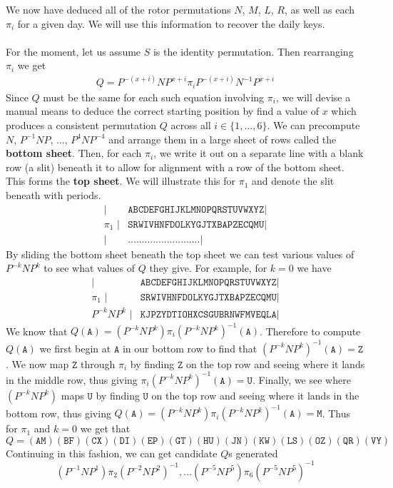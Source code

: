 We now have deduced all of the rotor permutations $N$, $M$, $L$, $R$,
as well as each
$\pi_i$ for a given day. We will use this information to recover
the daily keys.
\\\\For the moment, let us assume $S$ is the identity permutation. Then
rearranging $\pi_i$ we get
\begin{align}
  Q = P^{-(x+i)}NP^{x+i}\pi_iP^{-(x+i)}N^{-1}P^{x+i} \label{eq:q_eq}
\end{align}
Since $Q$ must be the same for each such equation involving
$\pi_i$, we will devise a manual means to deduce the correct
starting position by find a value of $x$ which produces a consistent
permutation $Q$ across all $i\in\{1,\dots,6\}$. We can
precompute $N$, $P^{-1}NP$, $\dots$, $P^{4}NP^{-4}$ and arrange them
in a large sheet of rows called the {\bf{bottom sheet}}. Then, for
each $\pi_i$, we write it out on a separate line with a blank row
(a slit) beneath it to allow for alignment with a row of the bottom
sheet. This forms the \textbf{top sheet}. We will
illustrate this for $\pi_1$ and denote the slit beneath with periods.
\begin{align*}
  \texttt{|}          & \texttt{ABCDEFGHIJKLMNOPQRSTUVWXYZ} \texttt{|} \\
  \pi_1\texttt{ |} & \texttt{SRWIVHNFDOLKYGJTXBAPZECQMU} \texttt{|} \\
  \texttt{|}          & \texttt{..........................} \texttt{|}
\end{align*}
By sliding the bottom sheet
beneath the top sheet we can test various values of $P^{-k}NP^{k}$ to
see what values of $Q$ they give. For example, for $k = 0$ we have
\begin{align*}
  \texttt{|}          & \texttt{ABCDEFGHIJKLMNOPQRSTUVWXYZ} \texttt{|} \\
  \pi_1\texttt{ |} & \texttt{SRWIVHNFDOLKYGJTXBAPZECQMU} \texttt{|} \\
  P^{-k}NP^{k} \texttt{ |}       &
  \texttt{KJPZYDTIOHXCSGUBRNWFMVEQLA} \texttt{|}
\end{align*}
We know that $Q(\texttt{A}) =
(P^{-k}NP^k)\pi_i(P^{-k}NP^k)^{-1}(\texttt{A})$. Therefore to compute
$Q(\texttt{A})$ we first begin at $\texttt{A}$ in our bottom row to
find that $(P^{-k}NP^k)^{-1}(\texttt{A})=\texttt{Z}$. We now map $\texttt{Z}$
through $\pi_i$ by finding $\texttt{Z}$ on the top row and seeing
where it lands in the middle row, thus giving
$\pi_i(P^{-k}NP^k)^{-1}(\texttt{A}) = \texttt{U}$. Finally, we see
where $(P^{-k}NP^k)$
maps $\texttt{U}$ by finding $\texttt{U}$ on the top row and seeing
where it lands in the bottom row, thus giving $Q(\texttt{A}) =
(P^{-k}NP^k)\pi_i(P^{-k}NP^k)^{-1}(\texttt{A}) = \texttt{M}$. Thus
for $\pi_1$ and $k=0$ we get that
\[
  Q =
  (\texttt{AM})(\texttt{BF})(\texttt{CX})(\texttt{DI})(\texttt{EP})(\texttt{GT})(\texttt{HU})(\texttt{JN})(\texttt{KW})(\texttt{LS})(\texttt{OZ})(\texttt{QR})(\texttt{VY})
\]
Continuing in this fashion, we can
get candidate $Q$s generated
\[(P^{-1}NP^1)\pi_2(P^{-2}NP^2)^{-1}, \dots
  (P^{-5}NP^5)\pi_6(P^{-5}NP^5)^{-1}
\]
